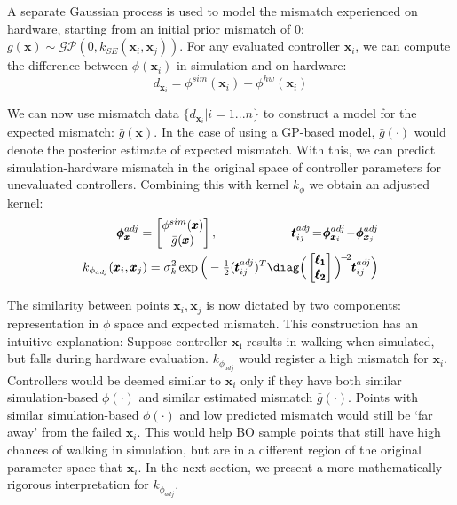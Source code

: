A separate Gaussian process is used to model the mismatch experienced on hardware, starting from an initial prior mismatch of 0: $g(\pmb{x})\!\sim\!\mathcal{GP}(0, k_{SE}(\pmb{x}_i,\pmb{x}_j))$.
For any evaluated controller $\pmb{x}_i$, we can compute the difference between $\phi(\pmb{x}_i)$ in simulation and on hardware: 
\begin{equation}
    d_{\pmb{x}_i}\!=\!\phi^{sim}(\pmb{x}_i) \!-\! \phi^{hw}(\pmb{x}_i)    
\end{equation}
 
We can now use mismatch data $\{ d_{\pmb{x}_i} | i=1...n \}$ to construct a model for the expected mismatch: $\bar{g}(\pmb{x})$. In the case of using a GP-based model, $\bar{g}(\cdot)$ would denote the posterior estimate of expected mismatch. With this, we can predict simulation-hardware mismatch in the original space of controller parameters for unevaluated controllers. Combining this with kernel $k_{\phi}$ we obtain an adjusted kernel:
\begin{align}
\label{eq:k_adj}
    \pmb{\phi}^{adj}_{\pmb{x}} = \begin{bmatrix} \phi^{sim}(\pmb{x}) \\ \bar{g}(\pmb{x}) \end{bmatrix}, \quad \quad \quad \quad \quad \quad 
    \pmb{t}_{ij}^{adj} \!=\! \pmb{\phi}^{adj}_{\pmb{x}_i} \!-\! \pmb{\phi}^{adj}_{\pmb{x}_j} \\
    k_{\phi_{adj}}(\pmb{x}_i, \pmb{x}_j) = \sigma_k^2 \exp\Big(- \tfrac{1}{2} (\pmb{t}_{ij}^{adj})^T \diag\Big(\begin{bmatrix}\pmb{\ell_1} \\ \pmb{\ell_2} \end{bmatrix}\Big)^{\!-\!2} \pmb{t}_{ij}^{adj} \Big) \\
\end{align}

The similarity between points $\pmb{x}_i, \pmb{x}_j$ is now dictated by two components: representation in $\phi$ space and expected mismatch. This construction has an intuitive explanation: Suppose controller $\pmb{x_i}$ results in walking when simulated, but falls during hardware evaluation. $k_{\phi_{adj}}$ would register a high mismatch for $\pmb{x}_i$. Controllers would be deemed similar to $\pmb{x}_i$ only if they have both similar simulation-based $\phi(\cdot)$ and similar estimated mismatch $\bar{g}(\cdot)$. Points with similar simulation-based $\phi(\cdot)$ and low predicted mismatch would still be `far away' from the failed $\pmb{x}_i$. This would help BO sample points that still have high chances of walking in simulation, but are in a different region of the original parameter space that $\pmb{x}_i$. In the next section, we present a more mathematically rigorous interpretation for $k_{\phi_{adj}}$.




